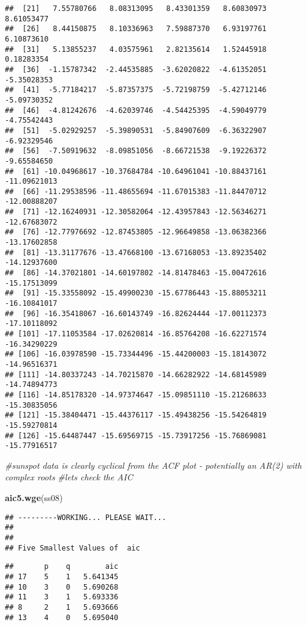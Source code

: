 \documentclass[
]{article}
\newenvironment{Shaded}{\begin{snugshade}}{\end{snugshade}}
\newcommand{\CommentTok}[1]{\textcolor[rgb]{0.56,0.35,0.01}{\textit{#1}}}
\newcommand{\KeywordTok}[1]{\textcolor[rgb]{0.13,0.29,0.53}{\textbf{#1}}}
\newcommand{\NormalTok}[1]{#1}
\begin{document}
\begin{verbatim}
##  [21]   7.55780766   8.08313095   8.43301359   8.60830973   8.61053477
##  [26]   8.44150875   8.10336963   7.59887370   6.93197761   6.10873610
##  [31]   5.13855237   4.03575961   2.82135614   1.52445918   0.18283354
##  [36]  -1.15787342  -2.44535885  -3.62020822  -4.61352051  -5.35028353
##  [41]  -5.77184217  -5.87357375  -5.72198759  -5.42712146  -5.09730352
##  [46]  -4.81242676  -4.62039746  -4.54425395  -4.59049779  -4.75542443
##  [51]  -5.02929257  -5.39890531  -5.84907609  -6.36322907  -6.92329546
##  [56]  -7.50919632  -8.09851056  -8.66721538  -9.19226372  -9.65584650
##  [61] -10.04968617 -10.37684784 -10.64961041 -10.88437161 -11.09621013
##  [66] -11.29538596 -11.48655694 -11.67015383 -11.84470712 -12.00888207
##  [71] -12.16240931 -12.30582064 -12.43957843 -12.56346271 -12.67683072
##  [76] -12.77976692 -12.87453805 -12.96649858 -13.06382366 -13.17602858
##  [81] -13.31177676 -13.47668100 -13.67168053 -13.89235402 -14.12937600
##  [86] -14.37021801 -14.60197802 -14.81478463 -15.00472616 -15.17513099
##  [91] -15.33558092 -15.49900230 -15.67786443 -15.88053211 -16.10841017
##  [96] -16.35418067 -16.60143749 -16.82624444 -17.00112373 -17.10118092
## [101] -17.11053584 -17.02620814 -16.85764208 -16.62271574 -16.34290229
## [106] -16.03978590 -15.73344496 -15.44200003 -15.18143072 -14.96516371
## [111] -14.80337243 -14.70215870 -14.66282922 -14.68145989 -14.74894773
## [116] -14.85178320 -14.97374647 -15.09851110 -15.21268633 -15.30835056
## [121] -15.38404471 -15.44376117 -15.49438256 -15.54264819 -15.59270814
## [126] -15.64487447 -15.69569715 -15.73917256 -15.76869081 -15.77916517
\end{verbatim}

\begin{Shaded}
\begin{Highlighting}[]
\CommentTok{#sunspot data is clearly cyclical from the ACF plot - potentially an AR(2) with complex roots  }
\CommentTok{#lets check the AIC}

\KeywordTok{aic5.wge}\NormalTok{(ss08)}
\end{Highlighting}
\end{Shaded}

\begin{verbatim}
## ---------WORKING... PLEASE WAIT... 
## 
## 
## Five Smallest Values of  aic
\end{verbatim}

\begin{verbatim}
##       p    q        aic
## 17    5    1   5.641345
## 10    3    0   5.690268
## 11    3    1   5.693336
## 8     2    1   5.693666
## 13    4    0   5.695040
\end{verbatim}
\end{document}
